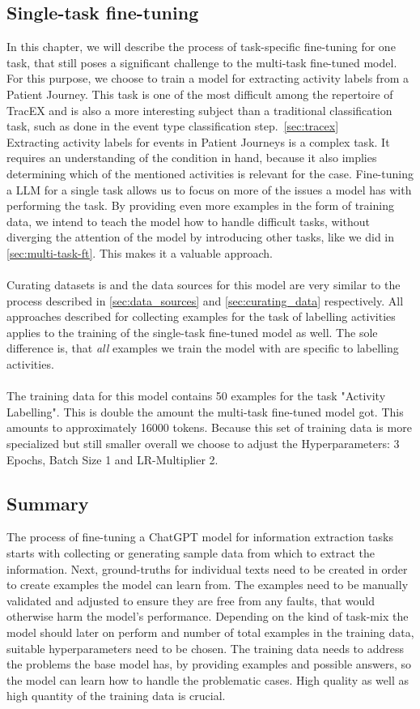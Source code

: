 \subsection{Single-task fine-tuning}\label{sec:single-task-ft}
In this chapter, we will describe the process of task-specific fine-tuning for one task, that still poses a significant challenge to the multi-task fine-tuned model. For this purpose, we choose to train a model for extracting activity labels from a Patient Journey. This task is one of the most difficult among the repertoire of TracEX and is also a more interesting subject than a traditional classification task, such as done in the event type classification step.~\ref{sec:tracex}\\
Extracting activity labels for events in Patient Journeys is a complex task. It requires an understanding of the condition in hand, because it also implies determining which of the mentioned activities is relevant for the case. Fine-tuning a LLM for a single task allows us to focus on more of the issues a model has with performing the task. By providing even more examples in the form of training data, we intend to teach the model how to handle difficult tasks, without diverging the attention of the model by introducing other tasks, like we did in \autoref{sec:multi-task-ft}. This makes it a valuable approach.\\\\
Curating datasets is and the data sources for this model are very similar to the process described in \autoref{sec:data_sources} and \autoref{sec:curating_data} respectively. All approaches described for collecting examples for the task of labelling activities applies to the training of the single-task fine-tuned model as well. The sole difference is, that \emph{all} examples we train the model with are specific to labelling activities.\\\\
The training data for this model contains 50 examples for the task "Activity Labelling". This is double the amount the multi-task fine-tuned model got. This amounts to approximately 16000 tokens. Because this set of training data is more specialized but still smaller overall we choose to adjust the Hyperparameters: 3 Epochs, Batch Size 1 and LR-Multiplier 2.

\subsection*{Summary}
The process of fine-tuning a ChatGPT model for information extraction tasks starts with collecting or generating sample data from which to extract the information. Next, ground-truths for individual texts need to be created in order to create examples the model can learn from. The examples need to be manually validated and adjusted to ensure they are free from any faults, that would otherwise harm the model's performance. Depending on the kind of task-mix the model should later on perform and number of total examples in the training data, suitable hyperparameters need to be chosen. The training data needs to address the problems the base model has, by providing examples and possible answers, so the model can learn how to handle the problematic cases. High quality as well as high quantity of the training data is crucial.
